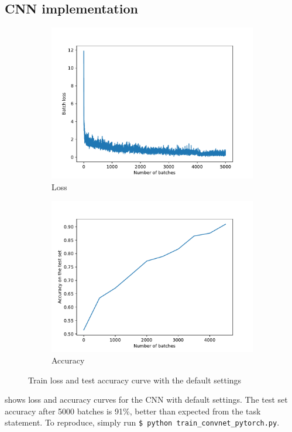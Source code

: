 \documentclass{article}
\begin{document}
\subsection{CNN implementation}
\begin{figure}
  \centering
  \begin{subfigure}{.49\linewidth}
    \includegraphics[width=\linewidth]{fig/cnn/loss_curve.pdf}
    \caption{Loss}
  \end{subfigure}
  \begin{subfigure}{.49\linewidth}
    \includegraphics[width=\linewidth]{fig/cnn/accuracy_curve.pdf}
    \caption{Accuracy}
  \end{subfigure}
  \caption{Train loss and test accuracy curve with the default settings}
  \label{fig:cnn}
\end{figure}
 shows loss and accuracy curves for the CNN with default settings. The test set
accuracy after 5000 batches is 91\%, better than expected from the task statement. To reproduce,
simply run \verb=$ python train_convnet_pytorch.py=.
\end{document}
